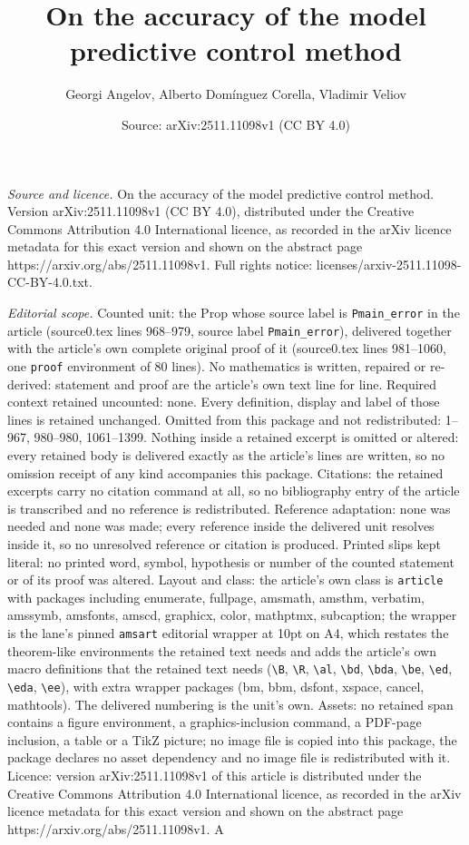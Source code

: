 \documentclass[10pt,a4paper]{amsart}
\title[On the accuracy of the model predictive control method]{On the accuracy of the model predictive control method}
\author{Georgi Angelov, Alberto Dom\'inguez Corella, Vladimir Veliov}
\date{Source: arXiv:2511.11098v1 (CC BY 4.0)}
\begin{document}
\maketitle

\noindent\emph{Source and licence.} On the accuracy of the model predictive control method. Version arXiv:2511.11098v1 (CC BY 4.0), distributed under the Creative Commons Attribution 4.0 International licence, as recorded in the arXiv licence metadata for this exact version and shown on the abstract page https://arxiv.org/abs/2511.11098v1. Full rights notice: licenses/arxiv-2511.11098-CC-BY-4.0.txt.\par\smallskip

\noindent\textit{Editorial scope.} Counted unit: the Prop whose source label is \texttt{Pmain\_error} in the article (source0.tex lines 968--979, source label \texttt{Pmain\_error}), delivered together with the article's own complete original proof of it (source0.tex lines 981--1060, one \texttt{proof} environment of 80 lines). No mathematics is written, repaired or re-derived: statement and proof are the article's own text line for line. Required context retained uncounted: none. Every definition, display and label of those lines is retained unchanged. Omitted from this package and not redistributed: 1--967, 980--980, 1061--1399. Nothing inside a retained excerpt is omitted or altered: every retained body is delivered exactly as the article's lines are written, so no omission receipt of any kind accompanies this package. Citations: the retained excerpts carry no citation command at all, so no bibliography entry of the article is transcribed and no reference is redistributed. Reference adaptation: none was needed and none was made; every reference inside the delivered unit resolves inside it, so no unresolved reference or citation is produced. Printed slips kept literal: no printed word, symbol, hypothesis or number of the counted statement or of its proof was altered. Layout and class: the article's own class is \texttt{article} with packages including enumerate, fullpage, amsmath, amsthm, verbatim, amssymb, amsfonts, amscd, graphicx, color, mathptmx, subcaption; the wrapper is the lane's pinned \texttt{amsart} editorial wrapper at 10pt on A4, which restates the theorem-like environments the retained text needs and adds the article's own macro definitions that the retained text needs (\texttt{\textbackslash B}, \texttt{\textbackslash R}, \texttt{\textbackslash al}, \texttt{\textbackslash bd}, \texttt{\textbackslash bda}, \texttt{\textbackslash be}, \texttt{\textbackslash ed}, \texttt{\textbackslash eda}, \texttt{\textbackslash ee}), with extra wrapper packages (bm, bbm, dsfont, xspace, cancel, mathtools). The delivered numbering is the unit's own. Assets: no retained span contains a figure environment, a graphics-inclusion command, a PDF-page inclusion, a table or a TikZ picture; no image file is copied into this package, the package declares no asset dependency and no image file is redistributed with it. Licence: version arXiv:2511.11098v1 of this article is distributed under the Creative Commons Attribution 4.0 International licence, as recorded in the arXiv licence metadata for this exact version and shown on the abstract page https://arxiv.org/abs/2511.11098v1. A 
\end{document}
